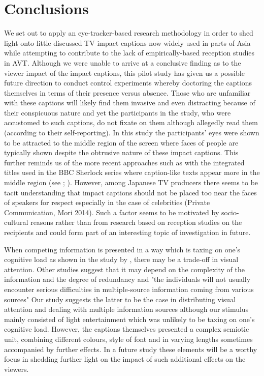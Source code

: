 \documentclass[output=paper]{langsci/langscibook}
\begin{document}
\section{Conclusions}

We set out to apply an eye-tracker-based research methodology in order to shed light onto little discussed TV impact captions now widely used in parts of Asia while attempting to contribute to the lack of empirically-based reception studies in AVT. Although we were unable to arrive at a conclusive finding as to the viewer impact of the impact captions, this pilot study has given us a possible future direction to conduct control experiments whereby doctoring the captions themselves in terms of their presence versus absence. Those who are unfamiliar with these captions will likely find them invasive and even distracting because of their conspicuous nature and yet the participants in the study, who were accustomed to such captions, do not fixate on them although allegedly read them (according to their self-reporting). In this study the participants' eyes were shown to be attracted to the middle region of the screen where faces of people are typically shown despite the obtrusive nature of these impact captions. This further reminds us of the more recent approaches such as with the integrated titles used in the BBC Sherlock series where caption-like texts appear more in the middle region (see \citet{Sasamoto2014}; \citet{Dwyer2015}).  However, among Japanese TV producers there seems to be tacit understanding that impact captions should not be placed too near the faces of speakers for respect especially in the case of celebrities (Private Communication, Mori 2014).  Such a factor seems to be motivated by socio-cultural reasons rather than from research based on reception studies on the recipients and could form part of an interesting topic of investigation in future. 


When competing information is presented in a way which is taxing on one's cognitive load as shown in the study by \citet{caffrey2009}, there may be a trade-off in visual attention.  Other studies \citep[p. 265]{perego2010} suggest that it may depend on the complexity of the information and the degree of redundancy and "the individuals will not usually encounter serious difficulties in multiple-source information coming from various sources" Our study suggests the latter to be the case in distributing visual attention and dealing with multiple information sources although our stimulus mainly consisted of light entertainment which was unlikely to be taxing on one's cognitive load.  However, the captions themselves presented a complex semiotic unit, combining different colours, style of font and in varying lengths sometimes accompanied by further effects. In a future study these elements will be a worthy focus in shedding further light on the impact of such additional effects on the viewers. 
\end{document}
